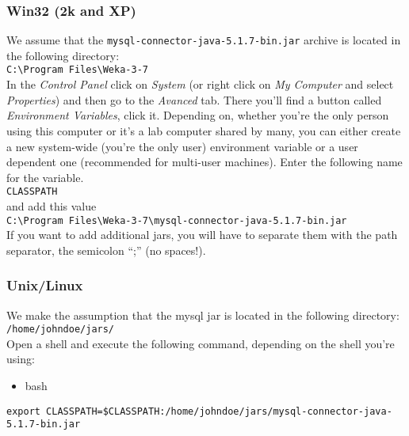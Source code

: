 \subsubsection*{Win32 (2k and XP)}
We assume that the \verb=mysql-connector-java-5.1.7-bin.jar= archive is located in the following directory:\\

\verb=C:\Program Files\Weka-3-7=\\

\noindent In the \emph{Control Panel} click on \emph{System} (or right click on
\emph{My Computer} and select \emph{Properties}) and then go to the
\emph{Avanced} tab. There you'll find a button called \emph{Environment
Variables}, click it. Depending on, whether you're the only person
using this computer or it's a lab computer shared by many, you can
either create a new system-wide (you're the only user) environment
variable or a user dependent one (recommended for multi-user
machines). Enter the following name for the variable.\\

\verb=CLASSPATH=\\

\noindent and add this value\\

\verb=C:\Program Files\Weka-3-7\mysql-connector-java-5.1.7-bin.jar=\\

\noindent If you want to add additional jars, you will have to separate them with the path separator, the semicolon ``;'' (no spaces!).

\subsubsection*{Unix/Linux}

We make the assumption that the mysql jar is located in the following directory:\\

\verb=/home/johndoe/jars/=\\

\noindent Open a shell and execute the following command, depending on the shell you're using:

\begin{itemize}
\item bash
\end{itemize}

\verb_export CLASSPATH=$CLASSPATH:/home/johndoe/jars/mysql-connector-java-5.1.7-bin.jar_

